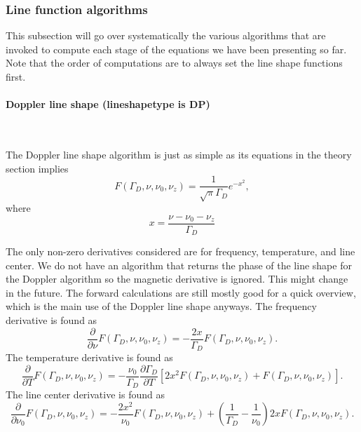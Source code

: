 \subsubsection{Line function algorithms}

This subsection will go over systematically the various algorithms that
are invoked to compute each stage of the equations we have been
presenting so far.  Note that the order of computations are to always set the
line shape functions first.

\paragraph*{Doppler line shape (lineshapetype is DP)} \

The Doppler line shape algorithm is just as simple as its equations in the
theory section implies
\begin{equation}
 F(\Gamma_D, \nu, \nu_0, \nu_z) = \frac{1}{\sqrt{\pi}\Gamma_D} e^{-x^2},
\end{equation}
where
\begin{equation}
 x = \frac{\nu-\nu_0-\nu_z}{\Gamma_D}
\end{equation}

The only non-zero derivatives considered are for frequency, temperature,
and line center.  We do not have an algorithm that returns the phase
of the line shape for the Doppler algorithm so the magnetic derivative
is ignored.  This might change in the future.  The forward calculations
are still mostly good for a quick overview, which is the main use of the Doppler
line shape anyways. The frequency derivative is found as
\begin{equation}
 \frac{\partial}{\partial \nu} F(\Gamma_D, \nu, \nu_0, \nu_z) = - \frac{2x}{\Gamma_D} F(\Gamma_D, \nu, \nu_0, \nu_z).
\end{equation}
The temperature derivative is found as
\begin{equation}
 \frac{\partial}{\partial T} F(\Gamma_D, \nu, \nu_0, \nu_z) = - \frac{\nu_0}{\Gamma_D}\frac{\partial \Gamma_D}{\partial T} \left[ 2x^2F(\Gamma_D, \nu, \nu_0, \nu_z) + F(\Gamma_D, \nu, \nu_0, \nu_z) \right].
\end{equation}
The line center derivative is found as
\begin{equation}
 \frac{\partial}{\partial \nu_0} F(\Gamma_D, \nu, \nu_0, \nu_z) = - \frac{2x^2}{\nu_0}F(\Gamma_D, \nu, \nu_0, \nu_z) + \left(\frac{1}{\Gamma_D}-\frac{1}{\nu_0}\right)2xF(\Gamma_D, \nu, \nu_0, \nu_z).
\end{equation}

